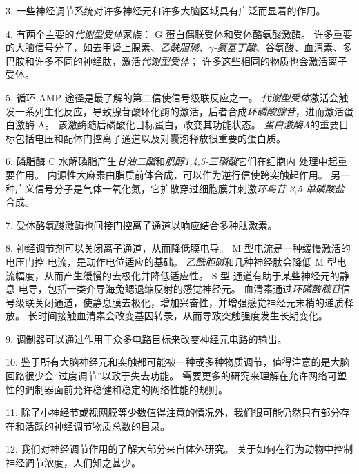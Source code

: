 3. 一些神经调节系统对许多神经元和许多大脑区域具有广泛而显着的作用。


4. 有两个主要的\textit{代谢型受体}家族：
G 蛋白偶联受体和受体酪氨酸激酶。 
许多重要的大脑信号分子，如去甲肾上腺素、\textit{乙酰胆碱}、\textit{$\gamma$-氨基丁酸}、谷氨酸、血清素、多巴胺和许多不同的神经肽，激活\textit{代谢型受体}；
许多这些相同的物质也会激活离子受体。 


5. 循环 AMP 途径是最了解的第二信使信号级联反应之一。
\textit{代谢型受体}激活会触发一系列生化反应，导致腺苷酸环化酶的激活，后者合成\textit{环磷酸腺苷}，进而激活蛋白激酶 A。
该激酶随后磷酸化目标蛋白，改变其功能状态。
\textit{蛋白激酶A}的重要目标包括电压和配体门控离子通道以及对囊泡释放很重要的蛋白质。 


6. 磷脂酶 C 水解磷脂产生\textit{甘油二酯}和\textit{肌醇1,4,5-三磷酸}它们在细胞内  处理中起重要作用。
内源性大麻素由脂质前体合成，可以作为逆行信使跨突触起作用。
另一种广义信号分子是气体一氧化氮，它扩散穿过细胞膜并刺激\textit{环鸟苷-3,5-单磷酸盐}合成。


7. 受体酪氨酸激酶也间接门控离子通道以响应结合多种肽激素。 


8. 神经调节剂可以关闭离子通道，从而降低膜电导。
M 型电流是一种缓慢激活的电压门控  电流，是动作电位适应的基础。
\textit{乙酰胆碱}和几种神经肽会降低 M 型电流幅度，从而产生缓慢的去极化并降低适应性。
S 型  通道有助于某些神经元的静息  电导，包括一类介导海兔鳃退缩反射的感觉神经元。
血清素通过\textit{环磷酸腺苷}信号级联关闭通道，使静息膜去极化，增加兴奋性，并增强感觉神经元末梢的递质释放。
长时间接触血清素会改变基因转录，从而导致突触强度发生长期变化。 


9. 调制器可以通过作用于众多电路目标来改变神经元电路的输出。 


10. 鉴于所有大脑神经元和突触都可能被一种或多种物质调节，值得注意的是大脑回路很少会“过度调节”以致于失去功能。
需要更多的研究来理解在允许网络可塑性的调制器面前允许稳健和稳定的网络性能的规则。


11. 除了小神经节或视网膜等少数值得注意的情况外，我们很可能仍然只有部分存在和活跃的神经调节物质总数的目录。


12. 我们对神经调节作用的了解大部分来自体外研究。
关于如何在行为动物中控制神经调节浓度，人们知之甚少。





